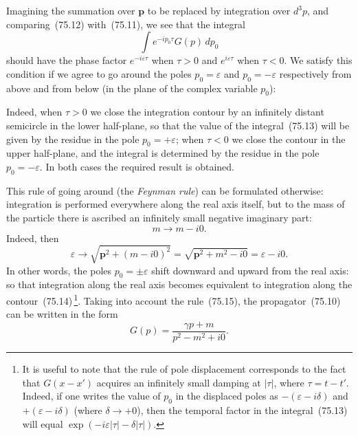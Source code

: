 Imagining the summation over $\mathbf{p}$ to be replaced by integration over $d^3p$, and comparing~(75.12) with~(75.11), we see that the integral
\begin{equation}
\int e^{-ip_0\tau}G(p)\,dp_0
\tag{75.13}
\end{equation}
should have the phase factor $e^{-i\varepsilon\tau}$ when $\tau > 0$ and $e^{i\varepsilon\tau}$ when $\tau < 0$. We satisfy this condition if we agree to go around the poles $p_0 = \varepsilon$ and $p_0 = -\varepsilon$ respectively from above and from below (in the plane of the complex variable $p_0$):

Indeed, when $\tau > 0$ we close the integration contour by an infinitely distant semicircle in the lower half-plane, so that the value of the integral~(75.13) will be given by the residue in the pole $p_0 = +\varepsilon$; when $\tau < 0$ we close the contour in the upper half-plane, and the integral is determined by the residue in the pole $p_0 = -\varepsilon$. In both cases the required result is obtained.

This rule of going around (the \textit{Feynman rule}) can be formulated otherwise: integration is performed everywhere along the real axis itself, but to the mass of the particle there is ascribed an infinitely small negative imaginary part:
\begin{equation}
m \to m - i0.
\tag{75.15}
\end{equation}
Indeed, then
\[
\varepsilon \to \sqrt{\mathbf{p}^2 + (m - i0)^2} = \sqrt{\mathbf{p}^2 + m^2 - i0} = \varepsilon - i0.
\]
In other words, the poles $p_0 = \pm\varepsilon$ shift downward and upward from the real axis:
so that integration along the real axis becomes equivalent to integration along the contour~(75.14)\,\footnote{It is useful to note that the rule of pole displacement corresponds to the fact that $G(x - x')$ acquires an infinitely small damping at $|\tau|$, where $\tau = t - t'$. Indeed, if one writes the value of $p_0$ in the displaced poles as $-(\varepsilon - i\delta)$ and $+(\varepsilon - i\delta)$ (where $\delta \to +0$), then the temporal factor in the integral~(75.13) will equal $\exp(-i\varepsilon|\tau| - \delta|\tau|)$.}. Taking into account the rule~(75.15), the propagator~(75.10) can be written in the form
\begin{equation}
G(p) = \frac{\gamma p + m}{p^2 - m^2 + i0}.
\tag{75.17}
\end{equation}

